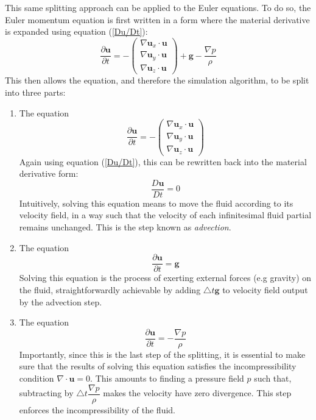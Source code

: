 This same splitting approach can be applied to the Euler equations. To do so, the Euler momentum equation is first written in a form where the material derivative is expanded using equation (\ref{Du/Dt}):
$$
\frac{\partial \textbf{u}}{\partial t}   =  -\begin{pmatrix}
    \nabla \textbf{u}_x  \cdot \textbf{u}\\
     \nabla \textbf{u}_y \cdot \textbf{u}\\
     \nabla \textbf{u}_z \cdot \textbf{u}
  \end{pmatrix}
  + \textbf{g}
  -\frac{\nabla p}{\rho} 
$$
This then allows the equation, and therefore the simulation algorithm, to be split into three parts:
\begin{enumerate}
    \item The equation
    $$
    \frac{\partial \textbf{u}}{\partial t}   =  -\begin{pmatrix}
        \nabla \textbf{u}_x  \cdot \textbf{u}\\
         \nabla \textbf{u}_y \cdot \textbf{u}\\
         \nabla \textbf{u}_z \cdot \textbf{u}\end{pmatrix} 
    $$
    Again using equation (\ref{Du/Dt}), this can be rewritten back into the material derivative form:
    $$
    \dfrac{D\textbf{u}}{Dt} = 0
    $$
    Intuitively, solving this equation means to move the fluid according to its velocity field, in a way such that the velocity of each infinitesimal fluid partial remains unchanged. This is the step known as \textit{advection}. 

    \item The equation
    $$
    \frac{\partial \textbf{u}}{\partial t}   = \textbf{g}
    $$
    Solving this equation is the process of exerting external forces (e.g gravity) on the fluid, straightforwardly achievable by adding $\triangle t\textbf{g}$ to velocity field output by the advection step.

    \item The equation
    $$
    \frac{\partial \textbf{u}}{\partial t}   = -\frac{\nabla p}{\rho} 
    $$
    Importantly, since this is the last step of the splitting, it is essential to make sure that the results of solving this equation satisfies the incompressibility condition $\nabla \cdot \textbf{u} = 0$. This amounts to finding a pressure field $p$ such that, subtracting by $\triangle t \dfrac{\nabla p}{\rho}$ makes the velocity have zero divergence. This step enforces the incompressibility of the fluid.

\end{enumerate}



